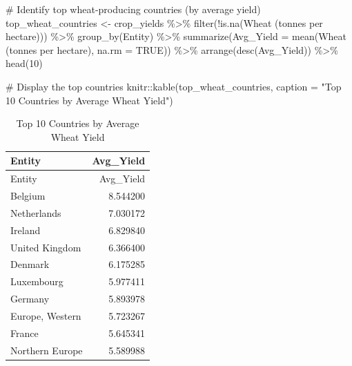 \documentclass[
  letterpaper,
]{book}
\newenvironment{Shaded}{\begin{snugshade}}{\end{snugshade}}
\newcommand{\AttributeTok}[1]{\textcolor[rgb]{0.40,0.45,0.13}{#1}}
\newcommand{\CommentTok}[1]{\textcolor[rgb]{0.37,0.37,0.37}{#1}}
\newcommand{\ConstantTok}[1]{\textcolor[rgb]{0.56,0.35,0.01}{#1}}
\newcommand{\DecValTok}[1]{\textcolor[rgb]{0.68,0.00,0.00}{#1}}
\newcommand{\FunctionTok}[1]{\textcolor[rgb]{0.28,0.35,0.67}{#1}}
\newcommand{\NormalTok}[1]{\textcolor[rgb]{0.00,0.23,0.31}{#1}}
\newcommand{\OtherTok}[1]{\textcolor[rgb]{0.00,0.23,0.31}{#1}}
\newcommand{\SpecialCharTok}[1]{\textcolor[rgb]{0.37,0.37,0.37}{#1}}
\newcommand{\StringTok}[1]{\textcolor[rgb]{0.13,0.47,0.30}{#1}}
\begin{document}
\begin{Shaded}
\begin{Highlighting}[]
\CommentTok{\# Identify top wheat{-}producing countries (by average yield)}
\NormalTok{top\_wheat\_countries }\OtherTok{\textless{}{-}}\NormalTok{ crop\_yields }\SpecialCharTok{\%\textgreater{}\%}
  \FunctionTok{filter}\NormalTok{(}\SpecialCharTok{!}\FunctionTok{is.na}\NormalTok{(}\StringTok{\textasciigrave{}}\AttributeTok{Wheat (tonnes per hectare)}\StringTok{\textasciigrave{}}\NormalTok{)) }\SpecialCharTok{\%\textgreater{}\%}
  \FunctionTok{group\_by}\NormalTok{(Entity) }\SpecialCharTok{\%\textgreater{}\%}
  \FunctionTok{summarize}\NormalTok{(}\AttributeTok{Avg\_Yield =} \FunctionTok{mean}\NormalTok{(}\StringTok{\textasciigrave{}}\AttributeTok{Wheat (tonnes per hectare)}\StringTok{\textasciigrave{}}\NormalTok{, }\AttributeTok{na.rm =} \ConstantTok{TRUE}\NormalTok{)) }\SpecialCharTok{\%\textgreater{}\%}
  \FunctionTok{arrange}\NormalTok{(}\FunctionTok{desc}\NormalTok{(Avg\_Yield)) }\SpecialCharTok{\%\textgreater{}\%}
  \FunctionTok{head}\NormalTok{(}\DecValTok{10}\NormalTok{)}

\CommentTok{\# Display the top countries}
\NormalTok{knitr}\SpecialCharTok{::}\FunctionTok{kable}\NormalTok{(top\_wheat\_countries, }\AttributeTok{caption =} \StringTok{"Top 10 Countries by Average Wheat Yield"}\NormalTok{)}
\end{Highlighting}
\end{Shaded}

\begin{longtable}[]{@{}lr@{}}
\caption{Top 10 Countries by Average Wheat Yield}\tabularnewline
\toprule\noalign{}
Entity & Avg\_Yield \\
\midrule\noalign{}
\endfirsthead
\toprule\noalign{}
Entity & Avg\_Yield \\
\midrule\noalign{}
\endhead
\bottomrule\noalign{}
\endlastfoot
Belgium & 8.544200 \\
Netherlands & 7.030172 \\
Ireland & 6.829840 \\
United Kingdom & 6.366400 \\
Denmark & 6.175285 \\
Luxembourg & 5.977411 \\
Germany & 5.893978 \\
Europe, Western & 5.723267 \\
France & 5.645341 \\
Northern Europe & 5.589988 \\
\end{longtable}
\end{document}

